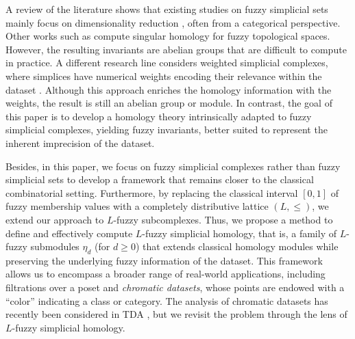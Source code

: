 \documentclass[a4paper,10pt]{article}
\begin{document}
A review of the literature shows that existing studies on fuzzy simplicial sets mainly focus on dimensionality reduction \cite{spivak2009metric,mcinnes2018umap,barth2025fuzzy,keck2025probabilistic,reyes2025assessing}, often from a categorical perspective. Other works such as \cite{wang1985singular} compute singular homology for fuzzy topological spaces. However, the resulting invariants are abelian groups that are difficult to compute in practice. 
A different research line considers weighted simplicial complexes, where simplices have numerical weights encoding their relevance within the dataset \cite{dawson1990homology,ren2018weighted}. Although this approach enriches the homology information with the weights, the result is still an abelian group or module.
In contrast, the goal of this paper is to develop a homology theory intrinsically adapted to fuzzy simplicial complexes, yielding fuzzy invariants, better suited to represent the inherent imprecision of the dataset.

Besides, in this paper, we focus on fuzzy simplicial complexes rather than fuzzy simplicial sets 
to develop a framework that remains closer to the classical combinatorial setting. Furthermore, by replacing the classical interval \([0,1]\) of fuzzy membership values with a completely distributive lattice \((L,\leq)\), we extend our approach to \(L\)-fuzzy subcomplexes. Thus, we propose a method to define and effectively compute \(L\)-fuzzy simplicial homology, 
that is, a family of \(L\)-fuzzy submodules \(\eta_d\) (for \(d\geq 0\)) that extends classical homology modules while preserving the underlying fuzzy information of the dataset. 
This framework allows us to encompass a broader range of real-world applications, including filtrations over a poset and \emph{chromatic datasets}, whose points are endowed with a ``color'' indicating a class or category. The analysis of chromatic datasets has recently been considered in TDA \cite{di2024chromatic,natarajan2024morse}, but we revisit the problem through the lens of \(L\)-fuzzy simplicial homology.
\end{document}
